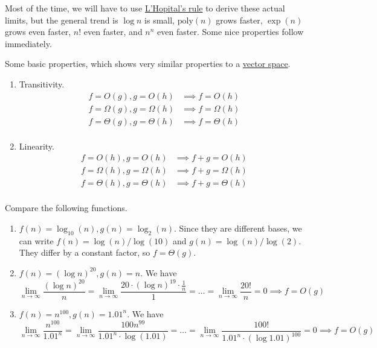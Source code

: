 Most of the time, we will have to use \hyperref[real-thm:lhopital]{L'Hopital's rule} to derive these actual limits, but the general trend is $\log n$ is small, $\mathrm{poly}(n)$ grows faster, $\exp(n)$ grows even faster, $n!$ even faster, and $n^n$ even faster. Some nice properties follow immediately. 

\begin{theorem}[Properties]
  \label{thm:properties}
  Some basic properties, which shows very similar properties to a \hyperref[lin-def:vector-space]{vector space}. 
  \begin{enumerate}
    \item Transitivity. 
    \begin{align}
      f = O(g), g = O(h) & \implies f = O(h) \\
      f = \Omega(g), g = \Omega(h) & \implies f = \Omega(h) \\
      f = \Theta(g), g = \Theta(h) & \implies f = \Theta(h) \\
    \end{align}

    \item Linearity.  
      \begin{align}
        f = O(h), g = O(h) & \implies f + g = O(h) \\
        f = \Omega(h), g = \Omega(h) & \implies f + g = \Omega(h) \\
        f = \Theta(h), g = \Theta(h) & \implies f + g = \Theta(h) \\
      \end{align}
  \end{enumerate}
\end{theorem}

\begin{example}
  \label{ex:comparing-runtimes}
  Compare the following functions. 
  \begin{enumerate}
    \item $f(n) = \log_{10} (n), g(n) = \log_2 (n)$. Since they are different bases, we can write $f(n) = \log (n) / \log (10)$ and $g(n) = \log(n) / \log(2)$. They differ by a constant factor, so $f = \Theta(g)$. 

    \item $f(n) = (\log n)^{20}, g(n) = n$. We have 
    \begin{equation}
      \lim_{n \rightarrow \infty} \frac{(\log n)^20}{n} = \lim_{n \rightarrow \infty} \frac{20 \cdot (\log n)^{19} \cdot \frac{1}{n}}{1} = \ldots = \lim_{n \rightarrow \infty} \frac{20!}{n} = 0 \implies f = O(g)
    \end{equation}

    \item $f(n) = n^{100}, g(n) = 1.01^n$. We have 
      \begin{equation}
        \lim_{n \rightarrow \infty} \frac{n^{100}}{1.01^n} = \lim_{n \rightarrow \infty} \frac{100 n^{99}}{1.01^n \cdot \log (1.01)} =  \ldots = \lim_{n \rightarrow \infty} \frac{100!}{1.01^n \cdot (\log 1.01)^100} = 0 \implies f = O(g)
      \end{equation}
  \end{enumerate}
\end{example}


